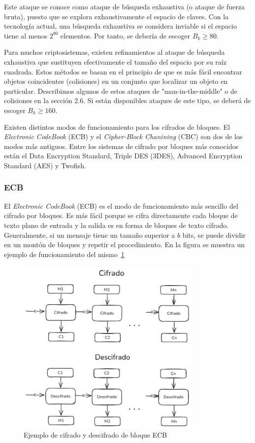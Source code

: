 Este ataque se conoce como ataque de búsqueda exhaustiva (o ataque de fuerza bruta), puesto que se explora exhaustivamente el espacio de claves. Con la tecnología actual, una búsqueda exhaustiva se considera inviable si el espacio tiene al menos \(2^{80}\) elementos. Por tanto, se debería de  escoger \(B_k \ge 80\).

Para muchos criptosistemas, existen refinamientos al ataque de búsqueda exhaustiva que sustituyen efectivamente el tamaño del espacio por su raíz cuadrada. Estos métodos se basan en el principio de que es más fácil encontrar objetos coincidentes (colisiones) en un conjunto que localizar un objeto en particular. Describimos algunos de estos ataques de "man-in-the-middle" o de colisiones en la sección 2.6. Si están disponibles ataques de este tipo, se deberá de escoger \(B_k \ge 160\).


Existen distintos modos de funcionamiento para los cifrados de bloques. El \emph{Electronic CodeBook} (ECB) y el \emph{Cipher-Block Chanining} (CBC) son dos de los modos más antiguos. Entre los sistemas de cifrado por bloques más conocidos están el Data Encryption Standard, Triple DES (3DES)\cite{tdes-techtarget}, Advanced Encryption Standard (AES)\cite{aes-nist} y Twofish\cite{twofish-schneier}.


\subsubsection{ECB}
El \emph{Electronic CodeBook} (ECB) es el modo de funcionamiento más sencillo del cifrado por bloques. Es más fácil porque se cifra directamente cada bloque de texto plano de entrada y la salida es en forma de bloques de texto cifrado. Generalmente, si un mensaje tiene un tamaño superior a $b$ bits, se puede dividir en un montón de bloques y repetir el procedimiento. En la figura se muestra un ejemplo de funcionamiento del mismo~\ref{fig:ECB_block_cypher}
\begin{figure}[H]
    \centering
    \includegraphics[width=0.8\textwidth]{imagenes/ECB_block_cypher.png}
    \caption{Ejemplo de cifrado y descifrado de bloque ECB}
    \label{fig:ECB_block_cypher}
\end{figure}

